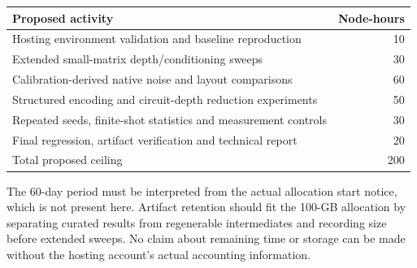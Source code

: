 \documentclass[11pt,a4paper]{article}
\begin{document}
\begin{center}
\begin{tabular}{@{}p{123mm}r@{}}\toprule
Proposed activity & Node-hours\\\midrule
Hosting environment validation and baseline reproduction & 10\\
Extended small-matrix depth/conditioning sweeps & 30\\
Calibration-derived native noise and layout comparisons & 60\\
Structured encoding and circuit-depth reduction experiments & 50\\
Repeated seeds, finite-shot statistics and measurement controls & 30\\
Final regression, artifact verification and technical report & 20\\\midrule
Total proposed ceiling & 200\\\bottomrule
\end{tabular}
\end{center}

The 60-day period must be interpreted from the actual allocation start
notice, which is not present here. Artifact retention should fit the
100-GB allocation by separating curated results from regenerable
intermediates and recording size before extended sweeps. No claim about
remaining time or storage can be made without the hosting account's
actual accounting information.
\end{document}
